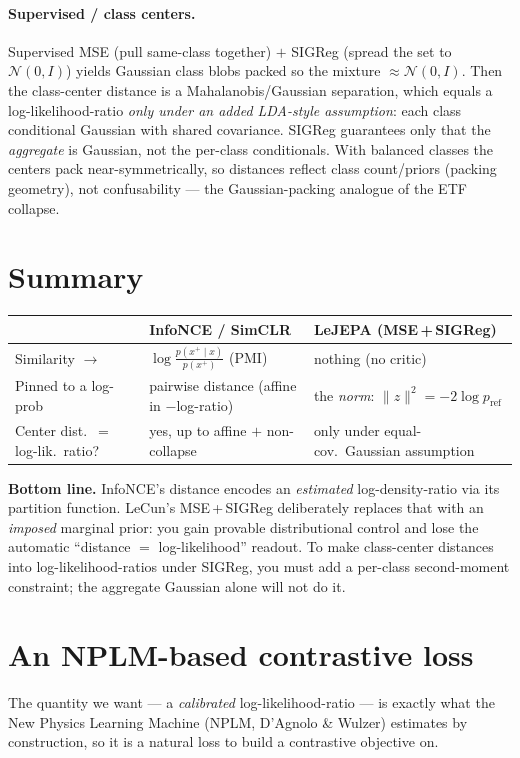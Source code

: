 \documentclass[11pt]{article}
\begin{document}
\paragraph{Supervised / class centers.}
Supervised MSE (pull same-class together) $+$ SIGReg (spread the set to
$\mathcal{N}(0,I)$) yields Gaussian class blobs packed so the mixture
$\approx\mathcal{N}(0,I)$. Then the class-center distance is a
Mahalanobis/Gaussian separation, which equals a log-likelihood-ratio
\emph{only under an added LDA-style assumption}: each class conditional Gaussian
with shared covariance. SIGReg guarantees only that the \emph{aggregate} is
Gaussian, not the per-class conditionals. With balanced classes the centers
pack near-symmetrically, so distances reflect class count/priors (packing
geometry), not confusability --- the Gaussian-packing analogue of the ETF
collapse.

\section{Summary}
\begin{center}
\begin{tabular}{@{}lll@{}}
\toprule
 & InfoNCE / SimCLR & LeJEPA (MSE\,+\,SIGReg)\\
\midrule
Similarity $\to$ & $\log\frac{p(x^+\mid x)}{p(x^+)}$ (PMI) & nothing (no critic)\\
Pinned to a log-prob & pairwise distance (affine in $-$log-ratio) & the \emph{norm}: $\|z\|^2=-2\log p_{\mathrm{ref}}$\\
Center dist.\ $=$ log-lik.\ ratio? & yes, up to affine $+$ non-collapse & only under equal-cov.\ Gaussian assumption\\
\bottomrule
\end{tabular}
\end{center}

\noindent
\textbf{Bottom line.} InfoNCE's distance encodes an \emph{estimated}
log-density-ratio via its partition function. LeCun's MSE\,+\,SIGReg deliberately
replaces that with an \emph{imposed} marginal prior: you gain provable
distributional control and lose the automatic ``distance $=$ log-likelihood''
readout. To make class-center distances into log-likelihood-ratios under SIGReg,
you must add a per-class second-moment constraint; the aggregate Gaussian alone
will not do it.

\section{An NPLM-based contrastive loss}
The quantity we want --- a \emph{calibrated} log-likelihood-ratio --- is exactly
what the New Physics Learning Machine (NPLM, D'Agnolo \& Wulzer) estimates by
construction, so it is a natural loss to build a contrastive objective on.
\end{document}
